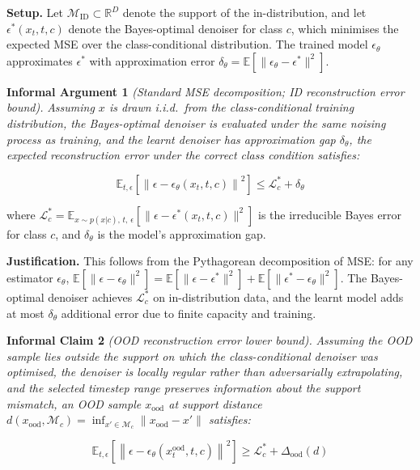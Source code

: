 \textbf{Setup.} Let $\mathcal{M}_{\text{ID}} \subset \mathbb{R}^D$ denote the support of the in-distribution, and let $\epsilon^*(x_t, t, c)$ denote the Bayes-optimal denoiser for class $c$, which minimises the expected MSE over the class-conditional distribution. The trained model $\epsilon_\theta$ approximates $\epsilon^*$ with approximation error $\delta_\theta = \mathbb{E}[\|\epsilon_\theta - \epsilon^*\|^2]$.

\textbf{Informal Argument 1} \emph{(Standard MSE decomposition; ID reconstruction error bound).} \textit{Assuming $x$ is drawn i.i.d.\ from the class-conditional training distribution, the Bayes-optimal denoiser is evaluated under the same noising process as training, and the learnt denoiser has approximation gap $\delta_\theta$, the expected reconstruction error under the correct class condition satisfies:}

\begin{equation}
\label{eq:meth:id_bound}
\mathbb{E}_{t,\epsilon} \left[ \left\| \epsilon - \epsilon_\theta(x_t, t, c) \right\|^2 \right] \leq \mathcal{L}_c^* + \delta_\theta
\end{equation}

where $\mathcal{L}_c^* = \mathbb{E}_{x \sim p(x|c),\, t,\, \epsilon}[\|\epsilon - \epsilon^*(x_t, t, c)\|^2]$ is the irreducible Bayes error for class $c$, and $\delta_\theta$ is the model's approximation gap.

\textbf{Justification.} This follows from the Pythagorean decomposition of MSE: for any estimator $\epsilon_\theta$, $\mathbb{E}[\|\epsilon - \epsilon_\theta\|^2] = \mathbb{E}[\|\epsilon - \epsilon^*\|^2] + \mathbb{E}[\|\epsilon^* - \epsilon_\theta\|^2]$. The Bayes-optimal denoiser achieves $\mathcal{L}_c^*$ on in-distribution data, and the learnt model adds at most $\delta_\theta$ additional error due to finite capacity and training.

\textbf{Informal Claim 2} \emph{(OOD reconstruction error lower bound).} \textit{Assuming the OOD sample lies outside the support on which the class-conditional denoiser was optimised, the denoiser is locally regular rather than adversarially extrapolating, and the selected timestep range preserves information about the support mismatch, an OOD sample $x_{\text{ood}}$ at support distance $d(x_{\text{ood}}, \mathcal{M}_c) = \inf_{x' \in \mathcal{M}_c} \|x_{\text{ood}} - x'\|$ satisfies:}

\begin{equation}
\label{eq:meth:ood_bound}
\mathbb{E}_{t,\epsilon} \left[ \left\| \epsilon - \epsilon_\theta(x_t^{\text{ood}}, t, c) \right\|^2 \right] \geq \mathcal{L}_c^* + \Delta_{\text{ood}}(d)
\end{equation}

